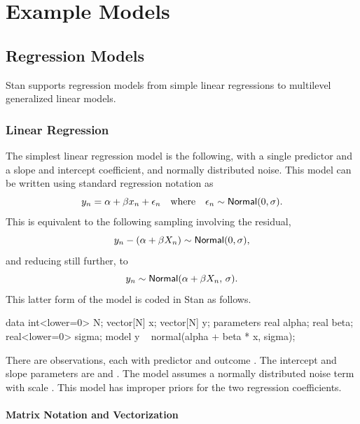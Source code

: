 \part{Example Models}\label{example-models.part}

\chapter{Regression Models}

\noindent
Stan supports regression models from simple linear regressions to
multilevel generalized linear models.  

\section{Linear Regression}

The simplest linear regression model is the following, with a single
predictor and a slope and intercept coefficient, and normally
distributed noise.  This model can be written using standard
regression notation as
%
\[
y_n = \alpha + \beta x_n + \epsilon_n
\ \ \ \mbox{where} \ \ \ 
\epsilon_n \sim \distro{Normal}(0,\sigma).
\]
This is equivalent to the following sampling involving the
residual,
\[
y_n - (\alpha + \beta X_n) \sim \distro{Normal}(0,\sigma),
\]
and reducing still further, to
\[
y_n \sim \distro{Normal}(\alpha + \beta X_n, \, \sigma).
\]
%
This latter form of the model is coded in Stan as follows.
%
\begin{stancode}
data {
  int<lower=0> N;
  vector[N] x;
  vector[N] y;
}
parameters {
  real alpha;
  real beta;
  real<lower=0> sigma;
}
model {
  y ~ normal(alpha + beta * x, sigma);
}
\end{stancode}
%
There are  observations, each with predictor  and
outcome \code{y[n]}.  The intercept and slope parameters are
 and .  The model assumes a normally
distributed noise term with scale .  This model has
improper priors for the two regression coefficients.

\subsection{Matrix Notation and Vectorization}

